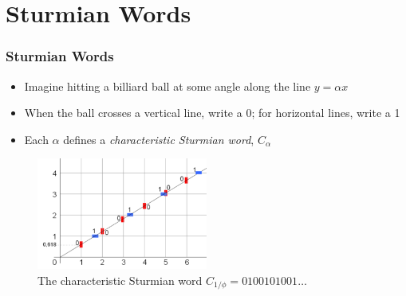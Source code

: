 \documentclass[leqno,presentation,usenames,dvipsnames]{beamer}
\begin{document}
        
    

\section{Sturmian Words}

\begin{frame}
    \frametitle{Sturmian Words}
    
    \begin{itemize}
        \item Imagine hitting a billiard ball at some angle along the line $y = \alpha x$
        \item When the ball crosses a vertical line, write a 0; for horizontal lines, write a 1
        \item Each $\alpha$ defines a \emph{characteristic Sturmian word}, $C_{\alpha}$
    \end{itemize}
    
\begin{figure}
    \centering
    \includegraphics[width=0.5\textwidth]{images/Fibonacci_word_cutting_sequence.png}
    \caption{The characteristic Sturmian word $C_{1/\phi} = 0100101001\ldots$}
\end{figure}
\end{frame}
\end{document}
